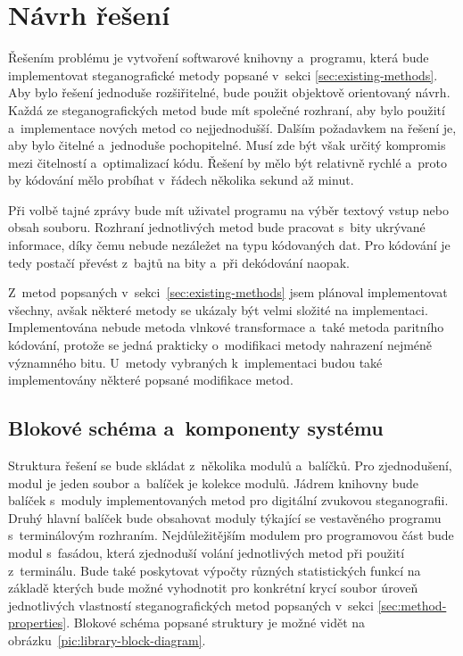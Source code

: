 \section{Návrh řešení}
\label{sec:solution-proposal}

Řešením problému je vytvoření softwarové knihovny a~programu, která bude
implementovat steganografické metody popsané v~sekci
\ref{sec:existing-methods}. Aby bylo řešení jednoduše rozšiřitelné, bude použit
objektově orientovaný návrh. Každá ze steganografických metod bude mít společné
rozhraní, aby bylo použití a~implementace nových metod co nejjednodušší. Dalším
požadavkem na řešení je, aby bylo čitelné a~jednoduše pochopitelné. Musí zde
být však určitý kompromis mezi čitelností a~optimalizací kódu. Řešení by mělo
být relativně rychlé a~proto by kódování mělo probíhat v~řádech několika sekund
až minut.

Při volbě tajné zprávy bude mít uživatel programu na výběr textový vstup nebo
obsah souboru. Rozhraní jednotlivých metod bude pracovat s~bity ukrývané
informace, díky čemu nebude nezáležet na typu kódovaných dat. Pro kódování je
tedy postačí převést z~bajtů na bity a~při dekódování naopak.

Z~metod popsaných v~sekci~\ref{sec:existing-methods} jsem plánoval
implementovat všechny, avšak některé metody se ukázaly být velmi složité na
implementaci. Implementována nebude metoda vlnkové transformace a~také metoda
paritního kódování, protože se jedná prakticky o~modifikaci metody nahrazení
nejméně významného bitu. U~metody vybraných k~implementaci budou také
implementovány některé popsané modifikace metod.

\subsection*{Blokové schéma a~komponenty systému}
\label{sub:solution-components}

Struktura řešení se bude skládat z~několika modulů a~balíčků. Pro zjednodušení,
modul je jeden soubor a~balíček je kolekce modulů. Jádrem knihovny bude balíček
s~moduly implementovaných metod pro digitální zvukovou steganografii. Druhý
hlavní balíček bude obsahovat moduly týkající se vestavěného programu
s~terminálovým rozhraním. Nejdůležitějším modulem pro programovou část bude
modul s~fasádou, která zjednoduší volání jednotlivých metod při použití
z~terminálu. Bude také poskytovat výpočty různých statistických funkcí na
základě kterých bude možné vyhodnotit pro konkrétní krycí soubor úroveň
jednotlivých vlastností steganografických metod popsaných v~sekci
\ref{sec:method-properties}. Blokové schéma popsané struktury je možné vidět na
obrázku~\ref{pic:library-block-diagram}.

